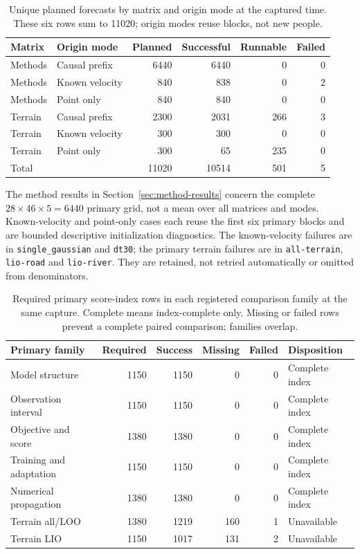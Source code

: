 \documentclass[11pt]{article}
\begin{document}
\begin{table}[htbp]
\centering\small
\caption{Unique planned forecasts by matrix and origin mode at the captured
time. These six rows sum to 11020; origin modes reuse blocks, not new people.}
\label{tab:execution-coverage}
\begin{tabular}{@{}llrrrr@{}}
\toprule
Matrix & Origin mode & Planned & Successful & Runnable & Failed\\
\midrule
Methods & Causal prefix & 6440 & 6440 & 0 & 0\\
Methods & Known velocity & 840 & 838 & 0 & 2\\
Methods & Point only & 840 & 840 & 0 & 0\\
Terrain & Causal prefix & 2300 & 2031 & 266 & 3\\
Terrain & Known velocity & 300 & 300 & 0 & 0\\
Terrain & Point only & 300 & 65 & 235 & 0\\
\midrule
Total & & 11020 & 10514 & 501 & 5\\
\bottomrule
\end{tabular}
\end{table}

The method results in Section~\ref{sec:method-results} concern the complete $28\times46\times5=6440$
primary grid, not a mean over all matrices and modes. Known-velocity and
point-only cases each reuse the first six primary blocks and are bounded
descriptive initialization diagnostics. The known-velocity failures are in
\texttt{single\_gaussian} and \texttt{dt30}; the primary terrain failures are
in \texttt{all-terrain}, \texttt{lio-road} and \texttt{lio-river}.
They are retained, not retried automatically or omitted from denominators.

\begin{table}[htbp]
\centering\small
\caption{Required primary score-index rows in each registered comparison
family at the same capture. Complete means index-complete only. Missing or
failed rows prevent a complete paired comparison; families overlap.}
\label{tab:family-coverage}
\begin{tabular}{@{}lrrrrl@{}}
\toprule
Primary family & Required & Success & Missing & Failed & Disposition\\
\midrule
Model structure & 1150 & 1150 & 0 & 0 & Complete index\\
Observation interval & 1150 & 1150 & 0 & 0 & Complete index\\
Objective and score & 1380 & 1380 & 0 & 0 & Complete index\\
Training and adaptation & 1150 & 1150 & 0 & 0 & Complete index\\
Numerical propagation & 1380 & 1380 & 0 & 0 & Complete index\\
Terrain all/LOO & 1380 & 1219 & 160 & 1 & Unavailable\\
Terrain LIO & 1150 & 1017 & 131 & 2 & Unavailable\\
\bottomrule
\end{tabular}
\end{table}
\end{document}

